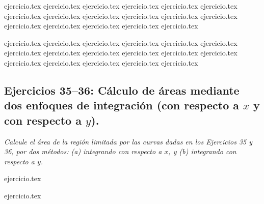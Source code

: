 \begin{enumerate}
    \begin{minipage}{0.45\textwidth}
    {ejercicio.tex}
    {ejercicio.tex}
    {ejercicio.tex}
    {ejercicio.tex}
    {ejercicio.tex}
    {ejercicio.tex}
    {ejercicio.tex}
    {ejercicio.tex}
    {ejercicio.tex}
    {ejercicio.tex}
    {ejercicio.tex}
    {ejercicio.tex}
    {ejercicio.tex}
    {ejercicio.tex}
    {ejercicio.tex}
    {ejercicio.tex}
    {ejercicio.tex}
    \end{minipage}%
    \begin{minipage}{0.45\textwidth}
    \setcounter{enumi}{17}
    {ejercicio.tex}
    {ejercicio.tex}
    {ejercicio.tex}
    {ejercicio.tex}
    {ejercicio.tex}
    {ejercicio.tex}
    {ejercicio.tex}
    {ejercicio.tex}
    {ejercicio.tex}
    {ejercicio.tex}
    {ejercicio.tex}
    {ejercicio.tex}
    {ejercicio.tex}
    {ejercicio.tex}
    {ejercicio.tex}
    {ejercicio.tex}
    {ejercicio.tex}
    \end{minipage}
\end{enumerate}

\subsection*{Ejercicios 35--36: Cálculo de áreas mediante dos enfoques de integración (con respecto a $x$ y con respecto a $y$).}

\noindent \textit{Calcule el área de la región limitada por las curvas dadas en los Ejercicios 35 y 36, por dos métodos: (a) integrando con respecto a $x$, y (b) integrando con respecto a $y$.}

\begin{enumerate}
    \setcounter{enumi}{34}
    \begin{minipage}{0.45\textwidth}
    {ejercicio.tex}
    \end{minipage}%
    \begin{minipage}{0.45\textwidth}
    {ejercicio.tex}
    \end{minipage}
\end{enumerate}

